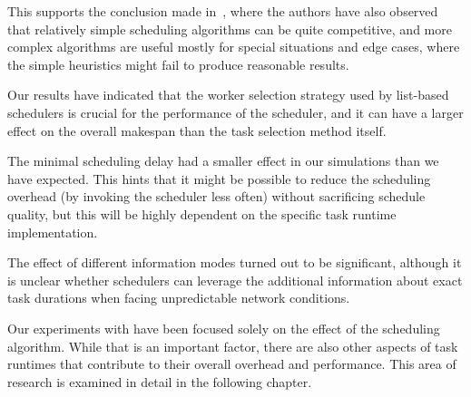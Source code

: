This supports the conclusion made in~\cite{wang2018list}, where the authors have also observed
that relatively simple scheduling algorithms can be quite competitive, and more complex algorithms
are useful mostly for special situations and edge cases, where the simple heuristics might fail to
produce reasonable results.

Our results have indicated that the worker selection strategy used by list-based schedulers is
crucial for the performance of the scheduler, and it can have a larger effect on the overall
makespan than the task selection method itself.

The minimal scheduling delay had a smaller effect in our simulations than we have expected. This
hints that it might be possible to reduce the scheduling overhead (by invoking the scheduler less
often) without sacrificing schedule quality, but this will be highly dependent on the specific task
runtime implementation.

The effect of different information modes turned out to be significant, although it is unclear
whether schedulers can leverage the additional information about exact task durations when facing
unpredictable network conditions.


Our experiments with \estee{} have been focused solely on the effect of the
scheduling algorithm. While that is an important factor, there are also other aspects of task
runtimes that contribute to their overall overhead and performance. This area of research is
examined in detail in the following chapter.
